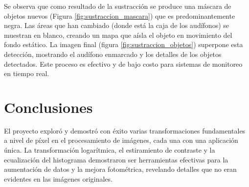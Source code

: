 \documentclass[12pt,letterpaper]{article}
\begin{document}
Se observa que como resultado de la sustracción se produce una máscara de objetos nuevos (Figura \ref{fig:sustraccion_mascara}) que es predominantemente negra. Las áreas que han cambiado (donde está la caja de los audífonos) se muestran en blanco, creando un mapa que aísla el objeto en movimiento del fondo estático. La imagen final (figura \ref{fig:sustraccion_objetos}) superpone esta detección, mostrando el audífono enmarcado y los detalles de los objetos detectados. Este proceso es efectivo y de bajo costo para sistemas de monitoreo en tiempo real.

\newpage

\section{Conclusiones}

El proyecto exploró y demostró con éxito varias transformaciones fundamentales a nivel de píxel en el procesamiento de imágenes, cada una con una aplicación única. La transformación logarítmica, el estiramiento de contraste y la ecualización del histograma demostraron ser herramientas efectivas para la aumentación de datos y la mejora fotométrica, revelando detalles que no eran evidentes en las imágenes originales. 

\newpage
\end{document}
